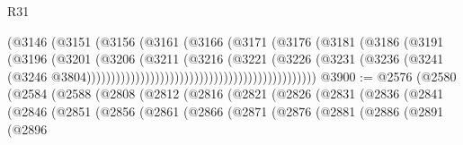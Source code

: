 \begin{lexlean}{R31}
\begin{coremodule}
                                                        (@3146
                                                          (@3151
                                                            (@3156
                                                              (@3161
                                                                (@3166
                                                                  (@3171
                                                                    (@3176
                                                                      (@3181
                                                                        (@3186
                                                                          (@3191
                                                                            (@3196
                                                                              (@3201
                                                                                (@3206
                                                                                  (@3211
                                                                                    (@3216
                                                                                      (@3221
                                                                                        (@3226
                                                                                          (@3231
                                                                                            (@3236
                                                                                              (@3241
                                                                                                (@3246
                                                                                                  @3804)))))))))))))))))))))))))))))))))))))))))))))))
@3900 := @2576
    (@2580
      (@2584
        (@2588
          (@2808
            (@2812
              (@2816
                (@2821
                  (@2826
                    (@2831
                      (@2836
                        (@2841
                          (@2846
                            (@2851
                              (@2856
                                (@2861
                                  (@2866
                                    (@2871
                                      (@2876
                                        (@2881
                                          (@2886
                                            (@2891
                                              (@2896

\end{coremodule}
\end{lexlean}
